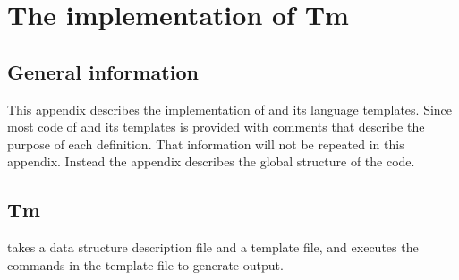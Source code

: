 \chapter{The implementation of Tm}
\label{s.impl}
\section{General information}
This appendix describes the implementation of {\Tm} and its language templates.
Since most code of {\Tm} and its templates is provided with comments that
describe the purpose of each definition.
That information will not be repeated in this appendix.
Instead the appendix describes the global structure of the code.
\section{Tm}
{\Tm} takes a data structure description file and a template file,
and executes the commands in the template file to generate output.
